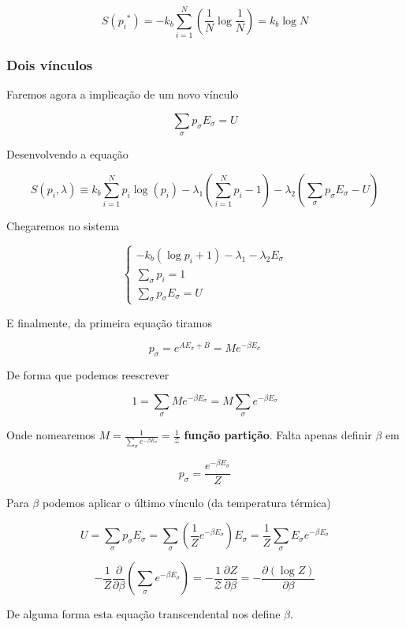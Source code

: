 \[
	S({p_i}^*) = - k_b \sum_{i=1}^{N} \left( \frac{1}{N} \log{\frac{1}{N}} \right) = k_b \log{N}
\]

\subsubsection{Dois vínculos}

Faremos agora a implicação de um novo vínculo

\[
\sum_{\sigma} p_\sigma E_\sigma = U
\]

Desenvolvendo a equação

\[
S({p_i}, \lambda) \equiv k_b \sum_{i=1}^{N} p_i \log{(p_i)} - \lambda_1 \left( \sum_{i=1}^{N}p_i -1 \right)  - \lambda_2 \left( \sum_\sigma  p_\sigma E_\sigma - U \right) 
\]

Chegaremos no sistema


\[
\begin{cases}
	-k_b (\log{p_i} + 1) - \lambda_1 - \lambda_2 E_\sigma \\
	\sum_{\sigma} p_i = 1 \\
	\sum_{\sigma} p_\sigma E_\sigma = U
\end{cases}
\]

E finalmente, da primeira equação tiramos

\[
	p_\sigma = e^{A E_\sigma + B} = M e^{-\beta E_\sigma}
\]

De forma que podemos reescrever

\[
	1 = \sum_\sigma M e^{-\beta E_\sigma} = M \sum_\sigma e^{-\beta E_\sigma}
\]

Onde nomearemos $M = \frac{1}{\sum_{\sigma}e^{-\beta E_\sigma}} = \frac{1}{\mathcal{Z}}$ \textbf{função partição}. Falta apenas definir $\beta$ em

\[
	p_\sigma = \frac{e^{-\beta E_\sigma}}{Z}
\]

Para $\beta$ podemos aplicar o último vínculo (da temperatura térmica)

\[
	U = \sum_\sigma p_\sigma E_\sigma = \sum_\sigma \left( \frac{1}{Z} e^{-\beta E_\sigma} \right) E_\sigma = \frac{1}{Z} \sum_\sigma E_\sigma e^{-\beta E_\sigma}
\]

\[
	-\frac{1}{Z} \frac{\partial }{ \partial \beta} \left( \sum_\sigma e^{-\beta E_\sigma} \right) = -\frac{1}{\mathcal{Z}} \frac{\partial Z}{\partial \beta} = - \frac{\partial (\log{Z})}{\partial \beta}
\]

De alguma forma esta equação transcendental nos define $\beta$.


